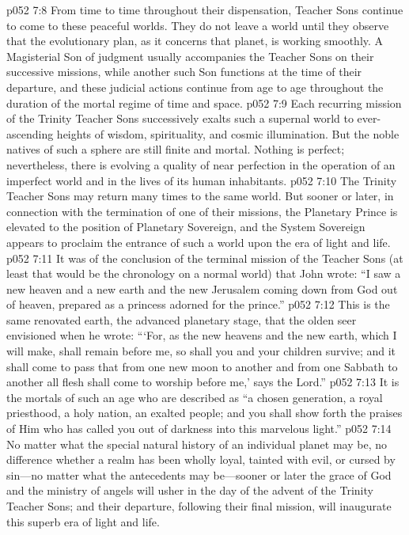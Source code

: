 \pc \vs p052 7:8 From time to time throughout their dispensation, Teacher Sons continue to come to these peaceful worlds. They do not leave a world until they observe that the evolutionary plan, as it concerns that planet, is working smoothly. A Magisterial Son of judgment usually accompanies the Teacher Sons on their successive missions, while another such Son functions at the time of their departure, and these judicial actions continue from age to age throughout the duration of the mortal regime of time and space.
\vs p052 7:9 Each recurring mission of the Trinity Teacher Sons successively exalts such a supernal world to ever\hyp{}ascending heights of wisdom, spirituality, and cosmic illumination. But the noble natives of such a sphere are still finite and mortal. Nothing is perfect; nevertheless, there is evolving a quality of near perfection in the operation of an imperfect world and in the lives of its human inhabitants.
\pc \vs p052 7:10 The Trinity Teacher Sons may return many times to the same world. But sooner or later, in connection with the termination of one of their missions, the Planetary Prince is elevated to the position of Planetary Sovereign, and the System Sovereign appears to proclaim the entrance of such a world upon the era of light and life.
\vs p052 7:11 It was of the conclusion of the terminal mission of the Teacher Sons (at least that would be the chronology on a normal world) that John wrote: “I saw a new heaven and a new earth and the new Jerusalem coming down from God out of heaven, prepared as a princess adorned for the prince.”
\vs p052 7:12 This is the same renovated earth, the advanced planetary stage, that the olden seer envisioned when he wrote: “‘For, as the new heavens and the new earth, which I will make, shall remain before me, so shall you and your children survive; and it shall come to pass that from one new moon to another and from one Sabbath to another all flesh shall come to worship before me,’ says the Lord.”
\vs p052 7:13 It is the mortals of such an age who are described as “a chosen generation, a royal priesthood, a holy nation, an exalted people; and you shall show forth the praises of Him who has called you out of darkness into this marvelous light.”
\pc \vs p052 7:14 No matter what the special natural history of an individual planet may be, no difference whether a realm has been wholly loyal, tainted with evil, or cursed by sin---no matter what the antecedents may be---sooner or later the grace of God and the ministry of angels will usher in the day of the advent of the Trinity Teacher Sons; and their departure, following their final mission, will inaugurate this superb era of light and life.
